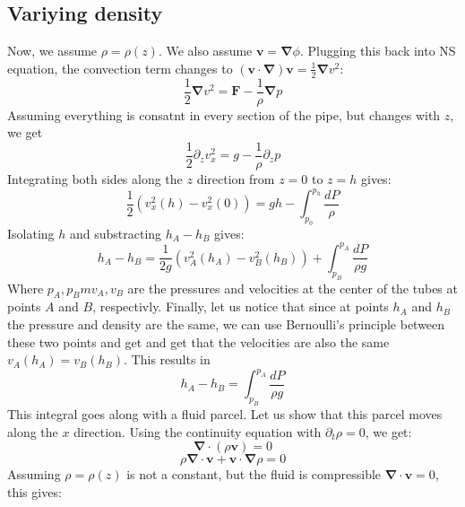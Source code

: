 \documentclass{article}
\begin{document}
\subsection{Variying density}
Now, we assume $\rho = \rho(z)$. We also assume $\boldsymbol{v} = \boldsymbol{\nabla}\phi$. Plugging this back into NS equation, the convection term changes to $(\boldsymbol{v}\cdot\boldsymbol{\nabla})\boldsymbol{v} = \frac{1}{2}\boldsymbol{\nabla}v^2$:
\begin{equation}
    \frac{1}{2}\boldsymbol{\nabla}v^2 = \boldsymbol{F} - \frac{1}{\rho}\boldsymbol{\nabla}p
\end{equation}
Assuming everything is consatnt in every section of the pipe, but changes with $z$, we get
\begin{equation}
    \frac{1}{2}\partial_z v_x^2 = g - \frac{1}{\rho}\partial_z p
\end{equation}
Integrating both sides along the $z$ direction from $z = 0$ to $z = h$ gives:
\begin{equation}
    \frac{1}{2}\left(v_x^2(h) - v_x^2(0)\right) = gh - \int_{p_0}^{p_h} \frac{dP}{\rho}
\end{equation}
Isolating $h$ and substracting $h_A - h_B$ gives:
\begin{equation}
    h_A - h_B = \frac{1}{2g}\left(v_A^2(h_A) - v_B^2(h_B)\right) + \int_{p_B}^{p_A} \frac{dP}{\rho g}
\end{equation}
Where $p_A, p_Bm v_A, v_B$ are the pressures and velocities at the center of the tubes at points $A$ and $B$, respectivly.
Finally, let us notice that since at points $h_A$ and $h_B$ the pressure and density are the same, we can use Bernoulli's principle between these two points and get and get that the velocities are also the same $v_A(h_A) = v_B(h_B)$. This results in
\begin{equation}
    h_A - h_B = \int_{p_B}^{p_A} \frac{dP}{\rho g}
\end{equation}
This integral goes along with a fluid parcel. Let us show that this parcel moves along the $x$ direction. Using the continuity equation with $\partial_t \rho = 0$, we get:
\begin{equation}
    \boldsymbol{\nabla}\cdot(\rho \boldsymbol{v}) = 0
\end{equation}
\begin{equation}
    \rho \boldsymbol{\nabla} \cdot \boldsymbol{v} + \boldsymbol{v}\cdot\boldsymbol{\nabla}\rho = 0
\end{equation}
Assuming $\rho = \rho(z)$ is not a constant, but the fluid is compressible $\boldsymbol{\nabla} \cdot \boldsymbol{v} = 0$, this gives:
\end{document}
